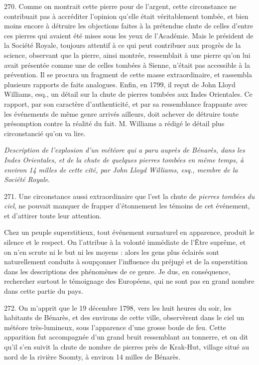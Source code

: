 \documentclass[a4paper, 11pt, oneside, polutonikogreek, french]{article}
\begin{document}
270. \og Comme on montrait cette pierre pour de l'argent, cette circonstance ne contribuait pas à accréditer l'opinion qu'elle était véritablement tombée, et bien moins encore à détruire les objections faites à la prétendue chute de celles d'entre ces pierres qui avaient été mises sous les yeux de l'Académie. Mais le président de la Société Royale, toujours attentif à ce qui peut contribuer aux progrès de la science, observant que la pierre, ainsi montrée, ressemblait à une pierre qu'on lui avait présentée comme une de celles tombées à Sienne, n'était pas accessible à la prévention. Il se procura un fragment de cette masse extraordinaire, et rassembla plusieurs rapports de faits analogues. Enfin, en 1799, il reçut de John Lloyd Williams, esq., un détail sur la chute de pierres tombées aux Indes Orientales. Ce rapport, par son caractère d'authenticité, et par sa ressemblance frappante avec les événements de même genre arrivés ailleurs, doit achever de détruire toute présomption contre la réalité du fait. M. Williams a rédigé le détail plus circonstancié qu'on va lire.

\emph{Description de l'explosion d'un météore qui a paru auprès de Bénarès, dans les Indes Orientales, et de la chute de quelques pierres tombées en même temps, à environ 14 milles de cette cité, par John Lloyd Williams, esq., membre de la Société Royale}.

271. \og Une circonstance aussi extraordinaire que l'est la chute de \emph{pierres tombées du ciel}, ne pouvait manquer de frapper d'étonnement les témoins de cet événement, et d'attirer toute leur attention. \fg

Chez un peuple superstitieux, tout événement surnaturel en apparence, produit le silence et le respect. On l'attribue à la volonté immédiate de l'Être suprême, et on n'en scrute ni le but ni les moyens : alors les gens plus éclairés sont naturellement conduits à soupçonner l'influence du préjugé et de la superstition dans les descriptions des phénomènes de ce genre. Je dus, en conséquence, rechercher surtout le témoignage des Européens, qui ne sont pas en grand nombre dans cette partie du pays.

272. On m'apprit que le 19 décembre 1798, vers les huit heures du soir, les habitants de Bénarès, et des environs de cette ville, observèrent dans le ciel un météore très-lumineux, sous l'apparence d'une grosse boule de feu. Cette apparition fut accompagnée d'un grand bruit ressemblant au tonnerre, et on dit qu'il s'en suivit la chute de nombre de pierres près de Krak-Hut, village situé au nord de la rivière Soomty, à environ 14 milles de Bénarès.
\end{document}
